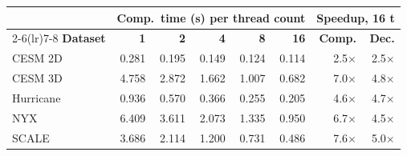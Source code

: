 \begin{tabular}{@{}lrrrrrrr@{}}
\toprule
 & \multicolumn{5}{c}{\textbf{Comp.\ time (s) per thread count}} & \multicolumn{2}{c}{\textbf{Speedup, 16 t}} \\
\cmidrule(lr){2-6}\cmidrule(lr){7-8}
\textbf{Dataset} & \textbf{1} & \textbf{2} & \textbf{4} & \textbf{8} & \textbf{16} & \textbf{Comp.} & \textbf{Dec.} \\
\midrule
CESM 2D & 0.281 & 0.195 & 0.149 & 0.124 & 0.114 & 2.5$\times$ & 2.5$\times$ \\
CESM 3D & 4.758 & 2.872 & 1.662 & 1.007 & 0.682 & 7.0$\times$ & 4.8$\times$ \\
Hurricane & 0.936 & 0.570 & 0.366 & 0.255 & 0.205 & 4.6$\times$ & 4.7$\times$ \\
NYX & 6.409 & 3.611 & 2.073 & 1.335 & 0.950 & 6.7$\times$ & 4.5$\times$ \\
SCALE & 3.686 & 2.114 & 1.200 & 0.731 & 0.486 & 7.6$\times$ & 5.0$\times$ \\
\bottomrule
\end{tabular}
